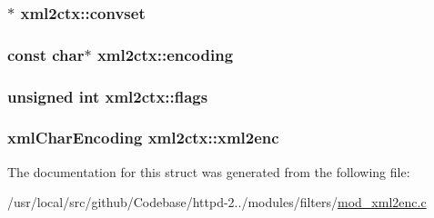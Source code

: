 \subsubsection[{\texorpdfstring{convset}{convset}}]{$\ast$ xml2ctx\+::convset}\hypertarget{structxml2ctx_a017eb9c7d51ddeb8c227a3d714b5a3ed}{}\label{structxml2ctx_a017eb9c7d51ddeb8c227a3d714b5a3ed}
\subsubsection[{\texorpdfstring{encoding}{encoding}}]{\setlength{\rightskip}{0pt plus 5cm}const char$\ast$ xml2ctx\+::encoding}\hypertarget{structxml2ctx_a5c9fbf6db02d5eee8767f39bff29c714}{}\label{structxml2ctx_a5c9fbf6db02d5eee8767f39bff29c714}
\subsubsection[{\texorpdfstring{flags}{flags}}]{\setlength{\rightskip}{0pt plus 5cm}unsigned {\bf int} xml2ctx\+::flags}\hypertarget{structxml2ctx_a4aee81c3c62abd8f282f8d7e2ed9d22b}{}\label{structxml2ctx_a4aee81c3c62abd8f282f8d7e2ed9d22b}
\subsubsection[{\texorpdfstring{xml2enc}{xml2enc}}]{\setlength{\rightskip}{0pt plus 5cm}xml\+Char\+Encoding xml2ctx\+::xml2enc}\hypertarget{structxml2ctx_abcf01fbd3a479f5e18c70e13b94a872e}{}\label{structxml2ctx_abcf01fbd3a479f5e18c70e13b94a872e}


The documentation for this struct was generated from the following file\+:\begin{DoxyCompactItemize}
\item 
/usr/local/src/github/\+Codebase/httpd-\/2../modules/filters/\hyperlink{mod__xml2enc_8c}{mod\+\_\+xml2enc.\+c}\end{DoxyCompactItemize}
